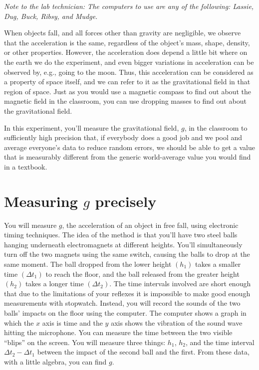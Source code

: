 \label{lab:g}

\emph{Note to the lab technician: The computers to use are any of the following:
Lassie, Dug, Buck, Ribsy, and Mudge.}

\apparatus
{}


\introduction
When objects fall, and all forces other than gravity are negligible,
we observe that the acceleration is the same, regardless of the object's
mass, shape, density, or other properties. However, the acceleration does
depend a little bit where on the earth we do the experiment, and even bigger
variations in acceleration can be observed by, e.g., going to the moon.
Thus, this acceleration can be considered as a property of space itself,
and we can refer to it as the gravitational field in that region of space.
Just as you would use a magnetic compass to find out about the magnetic field
in the classroom, you can use dropping masses to find out about the gravitational
field.

In this experiment, you'll measure the gravitational field, $g$, in the
classroom to sufficiently high precision that, if everybody does a good job and
we pool and average everyone's data to reduce random errors, we should be able to
get a value that is measurably different from the generic world-average value you
would find in a textbook.

\section*{Measuring $g$ precisely}
You will measure $g$, the
acceleration of an object in free fall, using electronic
timing techniques. The idea of the method is that you'll
have two steel balls hanging underneath electromagnets at
different heights. You'll simultaneously turn off the two
magnets using the same switch, causing the balls to drop at
the same moment. The ball dropped from the lower height
$(h_1)$ takes a smaller time $(\Delta t_1)$ to reach the floor, and
the ball released from the greater height $(h_2)$ takes a
longer time $(\Delta t_2)$. The time intervals involved are short
enough that due to the limitations of your reflexes it is
impossible to make good enough measurements with stopwatch. 
Instead, you will record the sounds of the two balls'
impacts on the floor using the computer.  The computer
shows a graph in which the $x$ axis is time and the $y$ axis
shows the vibration of the sound wave hitting the microphone.
You can measure the time between the two visible ``blips''
on the screen.  You will measure three things: $h_1$, $h_2$,
and the time interval $\Delta t_2-\Delta t_1$ between the impact of the
second ball and the first.  From these data, with a little
algebra, you can find $g$.

